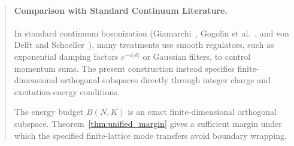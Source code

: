 \begin{quote}
\item[]\paragraph{Comparison with Standard Continuum Literature.}
In standard continuum bosonization (Giamarchi~\cite{giamarchi2004}, Gogolin et al.~\cite{gogolin1998}, and von Delft and Schoeller~\cite{vondelft1998}), many treatments use smooth regulators, such as exponential damping factors $e^{-\alpha |k|}$ or Gaussian filters, to control momentum sums. The present construction instead specifies finite-dimensional orthogonal subspaces directly through integer charge and excitation-energy conditions.

The energy budget $B(N,K)$ is an exact finite-dimensional orthogonal subspace. Theorem~\ref{thm:unified_margin} gives a sufficient margin under which the specified finite-lattice mode transfers avoid boundary wrapping.
\end{quote}
